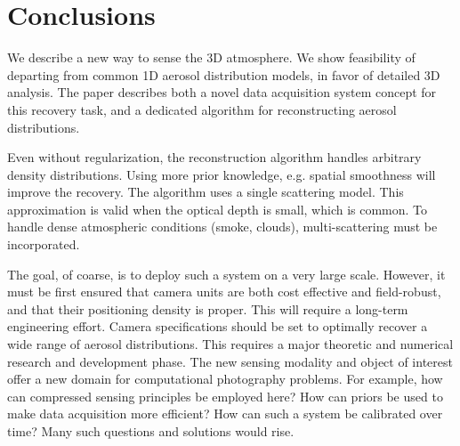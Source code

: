 \documentclass[10pt,letterpaper]{article}
\begin{document}

\section{Conclusions}
\label{sec:conclusions}

We describe a new way to sense the 3D atmosphere. We show feasibility
of departing from common 1D aerosol distribution models, in favor of
detailed 3D analysis.  The paper describes both a novel data
acquisition system concept for this recovery task, and a dedicated
algorithm for reconstructing aerosol distributions.

Even without regularization, the reconstruction algorithm handles
arbitrary density distributions. Using more prior knowledge,
e.g. spatial smoothness will improve the recovery.  The algorithm uses
a single scattering model. This approximation is valid when the
optical depth is small, which is common. To handle dense atmospheric
conditions (smoke, clouds), multi-scattering must be incorporated.

The goal, of coarse, is to deploy such a system on a very large
scale. However, it must be first ensured that camera units are both
cost effective and field-robust, and that their positioning density is
proper. This will require a long-term engineering effort. Camera
specifications should be set to optimally recover a wide range of
aerosol distributions. This requires a major theoretic and numerical
research and development phase.  The new sensing modality and object
of interest offer a new domain for computational photography
problems. For example, how can compressed sensing principles be
employed here? How can priors be used to make data acquisition more
efficient? How can such a system be calibrated over time? Many such
questions and solutions would rise.
\end{document}

